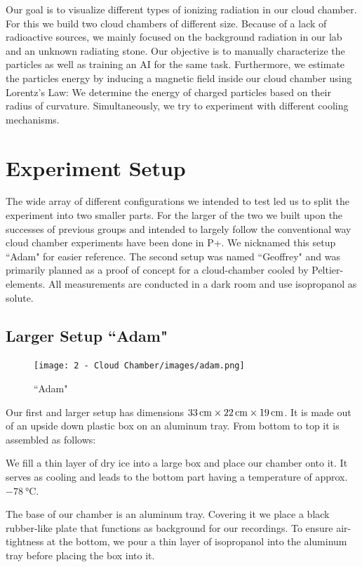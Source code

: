 \documentclass[10pt,a4paper]{article}
\begin{document}
Our goal is to visualize different types of ionizing radiation in our cloud chamber. For this we build two cloud chambers of different size. Because of a lack of radioactive sources, we mainly focused on the background radiation in our lab and an unknown radiating stone. Our objective is to manually characterize the particles as well as training an AI for the same task. Furthermore, we estimate the particles energy by inducing a magnetic field inside our cloud chamber using Lorentz's Law: We determine the energy of charged particles based on their radius of curvature. Simultaneously, we try to experiment with different cooling mechanisms.


\section{Experiment Setup}
The wide array of different configurations we intended to test led us to split the experiment into two smaller parts. For the larger of the two we built upon the successes of previous groups and intended to largely follow the conventional way cloud chamber experiments have been done in P+. We nicknamed this setup ``Adam" for easier reference.
The second setup was named ``Geoffrey" and was primarily planned as a proof of concept for a cloud-chamber cooled by Peltier-elements. All measurements are conducted in a dark room and use isopropanol as solute. 

\subsection{Larger Setup ``Adam"}
\begin{figure}
    \vspace{-\baselineskip}
    \texttt{[image: 2 - Cloud Chamber/images/adam.png]}        
    \caption{``Adam"}
    \label{fig:adam}
\end{figure}

Our first and larger setup has dimensions \( \qtyproduct{33x 22 x19}{\centi\meter}\). It is made out of an upside down plastic box on an aluminum tray. From bottom to top it is assembled as follows:

We fill a thin layer of dry ice into a large box and place our chamber onto it. It serves as cooling and leads to the bottom part having a temperature of approx. \(\qty{-78}{\celsius}\).

The base of our chamber is an aluminum tray. Covering it we place a black rubber-like plate that functions as background for our recordings. To ensure air-tightness at the bottom, we pour a thin layer of isopropanol into the aluminum tray before placing the box into it.
\end{document}
